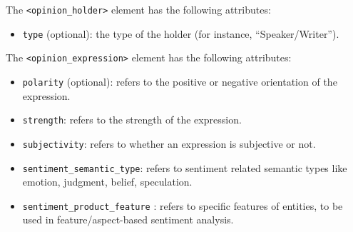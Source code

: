 The \texttt{<opinion\_holder>} element has the following attributes:
\begin{itemize}
\item \texttt{type} (optional): the type of the holder (for instance,
  ``Speaker/Writer'').
\end{itemize}

The \texttt{<opinion\_expression>} element has the following attributes:
\begin{itemize}
\item \texttt{polarity} (optional): refers to the positive or negative
  orientation of the expression.
\item \texttt{strength}: refers to the strength of the expression.
\item \texttt{subjectivity}: refers to whether an expression is subjective
  or not.
\item \texttt{sentiment\_semantic\_type}: refers to sentiment related
  semantic types like emotion, judgment, belief, speculation.
\item \texttt{sentiment\_product\_feature} : refers to specific features of
  entities, to be used in feature/aspect-based sentiment analysis.
\end{itemize}








